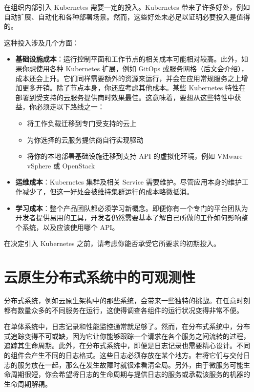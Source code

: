 \label{idx:2003}
在组织内部引入 Kubernetes 需要一定的投入。Kubernetes 带来了许多好处，例如自动扩展、自动化和各种部署场景。然而，这些好处未必足以证明必要投入是值得的。

这种投入涉及几个方面：

\begin{itemize}
\item \textbf{基础设施成本}：运行控制平面和工作节点的相关成本可能相对较高。此外，如果你想使用各种 Kubernetes 扩展，例如 GitOps 或服务网格（后文会介绍），成本还会上升。它们同样需要额外的资源来运行，并会在应用常规服务之上增加更多开销。除了节点本身，你还应考虑其他成本。某些 Kubernetes 特性在部署到受支持的云服务提供商时效果最佳。这意味着，要想从这些特性中获益，你必须走以下路线之一：

\begin{itemize}
\item 将工作负载迁移到专门受支持的云上
\item 为你选择的云服务提供商自行实现驱动
\item 将你的本地部署基础设施迁移到支持 API 的虚拟化环境，例如 VMware vSphere 或 OpenStack
\end{itemize}
\item \textbf{运维成本}：Kubernetes 集群及相关 Service 需要维护。尽管应用本身的维护工作减少了，但这一好处会被维持集群运行的成本略微抵消。
\label{idx:2004}
\item \textbf{学习成本}：整个产品团队都必须学习新概念。即便你有一个专门的平台团队为开发者提供易用的工具，开发者仍然需要基本了解自己所做的工作如何影响整个系统，以及应该使用哪个 API。
\end{itemize}

在决定引入 Kubernetes 之前，请考虑你能否承受它所要求的初期投入。

\section{云原生分布式系统中的可观测性}

\label{idx:2005}
分布式系统，例如云原生架构中的那些系统，会带来一些独特的挑战。在任意时刻都有数量众多的不同服务在运行，这使得调查各组件的运行状况变得非常不便。

\label{idx:2006}
在单体系统中，日志记录和性能监控通常就足够了。然而，在分布式系统中，分布式追踪变得不可或缺，因为它让你能够跟踪一个请求在各个服务之间流转的过程，追踪其生命周期。此外，在分布式系统中，即便是日志记录也需要精心设计。不同的组件会产生不同的日志格式。这些日志必须存放在某个地方。若将它们与交付日志的服务放在一起，那么在发生故障时就很难看清全局。另外，由于微服务可能生命周期很短，你会希望将日志的生命周期与提供日志的服务或承载该服务的机器的生命周期解耦。

